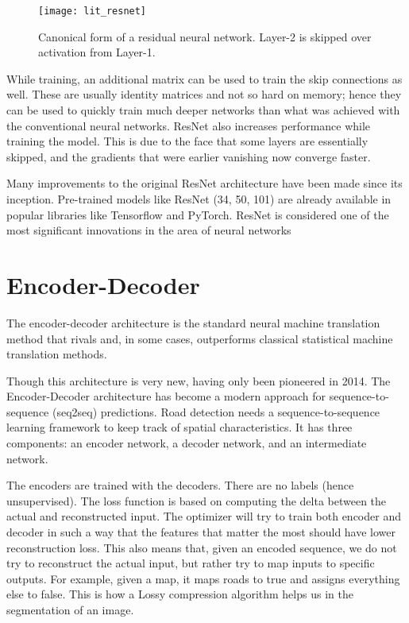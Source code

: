 \begin{figure}[h!]
    \centering
    \texttt{[image: lit\_resnet]}
    \caption[A residual network]{Canonical form of a residual neural network. Layer-2 is skipped over activation from Layer-1.}
    \label{fig:residual_network}
\end{figure}

While training, an additional matrix can be used to train the skip connections as well. These are usually identity matrices and not so hard on memory; hence they can be used to quickly train much deeper networks than what was achieved with the conventional neural networks. ResNet also increases performance while training the model. This is due to the face that some layers are essentially skipped, and the gradients that were earlier vanishing now converge faster.

Many improvements to the original ResNet architecture have been made since its inception. Pre-trained models like ResNet (34, 50, 101) are already available in popular libraries like Tensorflow and PyTorch. ResNet is considered one of the most significant innovations in the area of neural networks

\section{Encoder-Decoder}
The encoder-decoder architecture is the standard neural machine translation method that rivals and, in some cases, outperforms classical statistical machine translation methods.

Though this architecture is very new, having only been pioneered in 2014. The Encoder-Decoder architecture has become a modern approach for sequence-to-sequence (seq2seq) predictions. Road detection needs a sequence-to-sequence learning framework to keep track of spatial characteristics. It has three components: an encoder network, a decoder network, and an intermediate network.

The encoders are trained with the decoders. There are no labels (hence unsupervised). The loss function is based on computing the delta between the actual and reconstructed input. The optimizer will try to train both encoder and decoder in such a way that the features that matter the most should have lower reconstruction loss. This also means that, given an encoded sequence, we do not try to reconstruct the actual input, but rather try to map inputs to specific outputs. For example, given a map, it maps roads to true and assigns everything else to false. This is how a Lossy compression algorithm helps us in the segmentation of an image.

